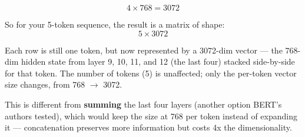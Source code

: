\[
4 \times 768 = 3072
\]

So for your 5-token sequence, the result is a matrix of shape:
\[
5 \times 3072
\]

Each row is still one token, but now represented by a 3072-dim vector --- the 768-dim hidden state from layer 9, 10, 11, and 12 (the last four) stacked side-by-side for that token. The number of tokens (5) is unaffected; only the per-token vector size changes, from 768 $\to$ 3072.

This is different from \textbf{summing} the last four layers (another option BERT's authors tested), which would keep the size at 768 per token instead of expanding it --- concatenation preserves more information but costs 4x the dimensionality.